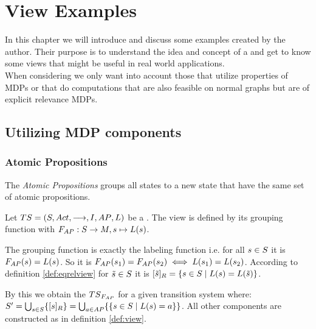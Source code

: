 \documentclass[preview]{standalone}
\begin{document}
\section{View Examples}
In this chapter we will introduce and discuss some \viewN examples created by the author. Their purpose is to understand the idea and concept of a \viewN and get to know some views that might be useful in real world applications. \\
When considering \viewsN we only want into account those that utilize properties of MDPs or that do computations that are also feasible on normal graphs but are of explicit relevance MDPs.
\subsection{Utilizing MDP components}
\subsubsection{Atomic Propositions}
The \emph{Atomic Propositions \viewNC} groups all states to a new state that have the same set of atomic propositions.

\begin{definition}	
	Let ${TS} = {({S}, {Act}, {\longrightarrow}, {I}, {AP}, {L})}$ be a \chosengraphtypeN. The view \viewatomicprops is defined by its grouping function \gfctatomicprops \grpfctN with $\gfctatomicprops : \states \to \imggrp, {\state}\mapsto{\labelingfct(\state)}$.
\end{definition}

The grouping function is exactly the labeling function i.e. for all ${s} \in {S}$ it is ${{{{F}}_{AP}}}({s}) = {L}({s})$. So it is ${{{{F}}_{AP}}}({s}_1) = {{{{F}}_{AP}}}({s}_2) \iff {L}({s}_1) = {L}({s}_2)$. According to definition \ref{def:eqrelview} for ${\tilde{{s}}} \in {S}$ it is ${{[{\tilde{{s}}}]_{{R}}}} = \{{s} \in {S} \mid {L}({s}) = {L}({\tilde{{s}}})\}$.

By this we obtain the \viewN ${{{{TS}}_{{{{F}}_{AP}}}}}$ for a given transition system \ts where: ${S}' = \bigcup_{{s} \in {S}} \{{{[{s}]_{{R}}}}\} =  \bigcup_{a \in {AP}} \{\{{s} \in {S} \mid {L}({s}) = a\}\}$. All other components are constructed as in definition \ref{def:view}.


\end{document}
